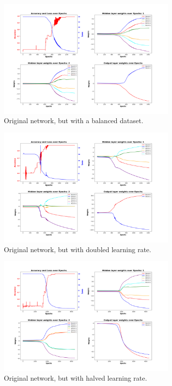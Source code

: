 \documentclass{article}
\begin{document}
    \begin{figure}
        \centering
        \includegraphics[width=0.8\textwidth]{images/plt-01}
        \caption{Original network, but with a balanced dataset.}
        \label{fig:3}
    \end{figure}

    \begin{figure}
        \centering
        \includegraphics[width=0.8\textwidth]{images/plt-02}
        \caption{Original network, but with doubled learning rate.}
        \label{fig:4}
    \end{figure}

    \begin{figure}
        \centering
        \includegraphics[width=0.8\textwidth]{images/plt-02-bis}
        \caption{Original network, but with halved learning rate.}
        \label{fig:5}
    \end{figure}
\end{document}
